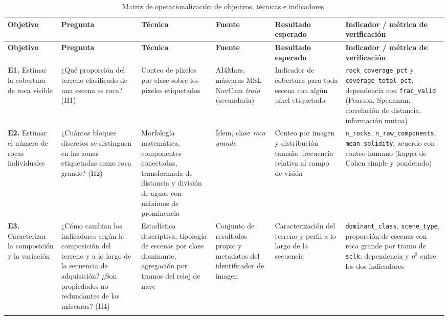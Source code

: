 \begin{landscape}
\begin{spacing}{1}
\small
\setlength{\tabcolsep}{4pt}
\begin{longtable}{@{}p{2.3cm}p{3.9cm}p{4.0cm}p{3.3cm}p{4.0cm}p{3.9cm}@{}}
  \caption{Matriz de operacionalización de objetivos, técnicas e indicadores.}
  \label{tab:operacionalizacion}\\
  \toprule
  \textbf{Objetivo} & \textbf{Pregunta} & \textbf{Técnica} & \textbf{Fuente} &
  \textbf{Resultado esperado} & \textbf{Indicador / métrica de verificación} \\
  \midrule
  \endfirsthead
  \toprule
  \textbf{Objetivo} & \textbf{Pregunta} & \textbf{Técnica} & \textbf{Fuente} &
  \textbf{Resultado esperado} & \textbf{Indicador / métrica de verificación} \\
  \midrule
  \endhead
  \bottomrule
  \endfoot

  \textbf{E1.} Estimar la cobertura de roca visible
  & ¿Qué proporción del terreno clasificado de una escena es roca? (H1)
  & Conteo de píxeles por clase sobre los píxeles etiquetados
  & AI4Mars, máscaras MSL NavCam \textit{train} (secundaria)
  & Indicador de cobertura para toda escena con algún píxel etiquetado
  & \texttt{rock\_coverage\_pct} y \texttt{coverage\_total\_pct}; dependencia con
    \texttt{frac\_valid} (Pearson, Spearman, correlación de distancia, información mutua) \\
  \addlinespace

  \textbf{E2.} Estimar el número de rocas individuales
  & ¿Cuántos bloques discretos se distinguen en las zonas etiquetadas como roca grande? (H2)
  & Morfología matemática, componentes conectadas, transformada de distancia y división de
    aguas con máximos de prominencia
  & Ídem, clase \textit{roca grande}
  & Conteo por imagen y distribución tamaño--frecuencia relativa al campo de visión
  & \texttt{n\_rocks}, \texttt{n\_raw\_components}, \texttt{mean\_solidity}; acuerdo con
    conteo humano (kappa de Cohen simple y ponderado) \\
  \addlinespace

  \textbf{E3.} Caracterizar la composición y la variación
  & ¿Cómo cambian los indicadores según la composición del terreno y a lo largo de la
    secuencia de adquisición? ¿Son propiedades no redundantes de las máscaras? (H4)
  & Estadística descriptiva, tipología de escenas por clase dominante, agregación por
    tramos del reloj de nave
  & Conjunto de resultados propio y metadatos del identificador de imagen
  & Caracterización del terreno y perfil a lo largo de la secuencia
  & \texttt{dominant\_class}, \texttt{scene\_type}, proporción de escenas con roca grande
    por tramo de \texttt{sclk}; dependencia y $\eta^2$ entre los dos indicadores \\
  \addlinespace


\end{longtable}
\end{spacing}
\end{landscape}
